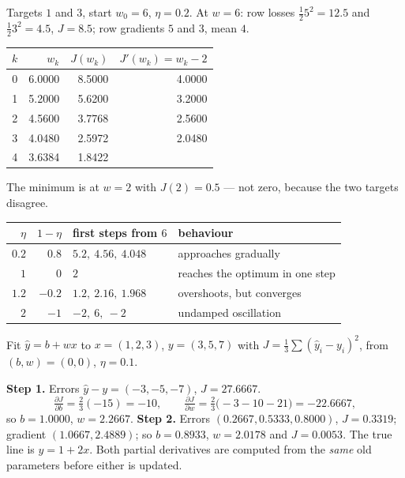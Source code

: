 \documentclass[11pt]{article}
\begin{document}
\begin{worked}
Targets $1$ and $3$, start $w_0 = 6$, $\eta = 0.2$. At $w = 6$: row losses
$\tfrac12 5^2 = 12.5$ and $\tfrac12 3^2 = 4.5$, $J = 8.5$; row gradients $5$
and $3$, mean $4$.
\begin{center}
\begin{tabular}{@{}rrrr@{}}
\toprule
$k$ & $w_k$ & $J(w_k)$ & $J'(w_k) = w_k - 2$\\ \midrule
0 & 6.0000 & 8.5000 & 4.0000\\
1 & 5.2000 & 5.6200 & 3.2000\\
2 & 4.5600 & 3.7768 & 2.5600\\
3 & 4.0480 & 2.5972 & 2.0480\\
4 & 3.6384 & 1.8422 & \\
\bottomrule
\end{tabular}
\end{center}
The minimum is at $w = 2$ with $J(2) = 0.5$ --- not zero, because the two
targets disagree.

\begin{center}
\small
\begin{tabular}{@{}rrll@{}}
\toprule
$\eta$ & $1 - \eta$ & first steps from $6$ & behaviour\\ \midrule
$0.2$ & $0.8$ & $5.2,\ 4.56,\ 4.048$ & approaches gradually\\
$1$ & $0$ & $2$ & reaches the optimum in one step\\
$1.2$ & $-0.2$ & $1.2,\ 2.16,\ 1.968$ & overshoots, but converges\\
$2$ & $-1$ & $-2,\ 6,\ -2$ & undamped oscillation\\
\bottomrule
\end{tabular}
\end{center}
\end{worked}

\begin{worked}
Fit $\hat y = b + wx$ to $x = (1,2,3)$, $y = (3,5,7)$ with
$J = \frac13\sum(\hat y_i - y_i)^2$, from $(b, w) = (0, 0)$, $\eta = 0.1$.

\textbf{Step 1.} Errors $\hat y - y = (-3, -5, -7)$, $J = 27.6667$.
\[
  \tfrac{\partial J}{\partial b} = \tfrac23(-15) = -10, \qquad
  \tfrac{\partial J}{\partial w} = \tfrac23\bigl(-3 - 10 - 21\bigr) = -22.6667,
\]
so $b = 1.0000$, $w = 2.2667$. \textbf{Step 2.} Errors
$(0.2667, 0.5333, 0.8000)$, $J = 0.3319$; gradient $(1.0667, 2.4889)$; so
$b = 0.8933$, $w = 2.0178$ and $J = 0.0053$. The true line is $y = 1 + 2x$.
Both partial derivatives are computed from the \emph{same} old parameters
before either is updated.
\end{worked}
\end{document}
